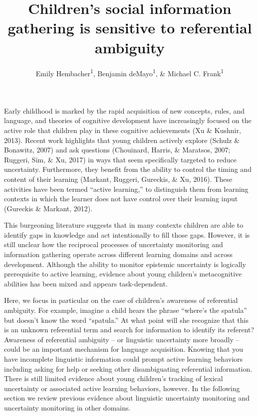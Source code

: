 \documentclass[english,,man]{apa6}
\title{Children's social information gathering is sensitive to referential
ambiguity}
\author{Emily Hembacher\textsuperscript{1}, Benjamin deMayo\textsuperscript{1},
\& Michael C. Frank\textsuperscript{1}}
\date{}
\affiliation{
\vspace{0.5cm}
\textsuperscript{1} Stanford University}
\begin{document}
\maketitle

Early childhood is marked by the rapid acquisition of new concepts,
rules, and language, and theories of cognitive development have
increasingly focused on the active role that children play in these
cognitive achievements (Xu \& Kushnir, 2013). Recent work highlights
that young children actively explore (Schulz \& Bonawitz, 2007) and ask
questions (Chouinard, Harris, \& Maratsos, 2007; Ruggeri, Sim, \& Xu,
2017) in ways that seem specifically targeted to reduce uncertainty.
Furthermore, they benefit from the ability to control the timing and
content of their learning (Markant, Ruggeri, Gureckis, \& Xu, 2016).
These activities have been termed \enquote{active learning,} to
distinguish them from learning contexts in which the learner does not
have control over their learning input (Gureckis \& Markant, 2012).

This burgeoning literature suggests that in many contexts children are
able to identify gaps in knowledge and act intentionally to fill those
gaps. However, it is still unclear how the reciprocal processes of
uncertainty monitoring and information gathering operate across
different learning domains and across development. Although the ability
to monitor epistemic uncertainty is logically prerequisite to active
learning, evidence about young children's metacognitive abilities has
been mixed and appears task-dependent.

Here, we focus in particular on the case of children's awareness of
referential ambiguity. For example, imagine a child hears the phrase
\enquote{where's the spatula} but doesn't know the word
\enquote{spatula.} At what point will she recognize that this is an
unknown referential term and search for information to identify its
referent? Awareness of referential ambiguity -- or linguistic
uncertainty more broadly -- could be an important mechanism for language
acquisition. Knowing that you have incomplete linguistic information
could prompt active learning behaviors including asking for help or
seeking other disambiguating referential information. There is still
limited evidence about young children's tracking of lexical uncertainty
or associated active learning behaviors, however. In the following
section we review previous evidence about linguistic uncertainty
monitoring and uncertainty monitoring in other domains.
\end{document}
